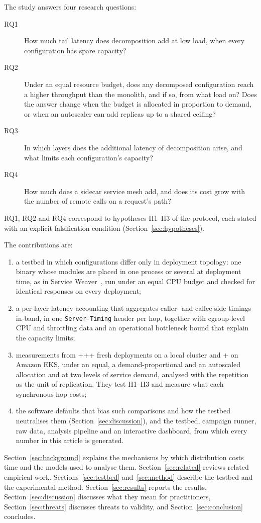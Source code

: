 The study answers four research questions:
\begin{description}
\item[RQ1] How much tail latency does decomposition add at low load, when every configuration has spare
capacity?
\item[RQ2] Under an equal resource budget, does any decomposed configuration reach a higher throughput than the
monolith, and if so, from what load on? Does the answer change when the budget is allocated in
proportion to demand, or when an autoscaler can add replicas up to a shared ceiling?
\item[RQ3] In which layers does the additional latency of decomposition arise, and what limits each
configuration's capacity?
\item[RQ4] How much does a sidecar service mesh add, and does its cost grow with the number of remote calls on a
request's path?
\end{description}
RQ1, RQ2 and RQ4 correspond to hypotheses H1--H3 of the protocol, each stated with an explicit falsification
condition (Section~\ref{sec:hypotheses}).



The contributions are:
\begin{enumerate}
\item a testbed in which configurations differ only in deployment topology: one binary whose modules are placed in
one process or several at deployment time, as in Service Weaver~\cite{Ghemawat2023}, run under an equal CPU budget
and checked for identical responses on every deployment;
\item a per-layer latency accounting that aggregates caller- and callee-side timings in-band, in one
\texttt{Server-Timing} header per hop, together with cgroup-level CPU and throttling data and an operational
bottleneck bound that explain the capacity limits;
\item measurements from \the\numexpr{}+++\relax{} fresh
deployments on a local cluster and \the\numexpr{}+\relax{} on Amazon EKS, under an
equal, a demand-proportional and an autoscaled allocation and at two levels of service demand, analysed with the repetition as the unit of
replication. They test H1--H3 and measure what each synchronous hop costs;
\item the software defaults that bias such comparisons and how the testbed neutralises them (Section~\ref{sec:discussion}),
and the testbed, campaign runner, raw data, analysis pipeline and an interactive dashboard, from which every number
in this article is generated.
\end{enumerate}

Section~\ref{sec:background} explains the mechanisms by which distribution costs time and the models used to
analyse them. Section~\ref{sec:related} reviews related empirical work. Sections~\ref{sec:testbed}
and~\ref{sec:method} describe the testbed and the experimental method. Section~\ref{sec:results} reports the results, Section~\ref{sec:discussion} discusses what they mean for practitioners,
Section~\ref{sec:threats} discusses threats to validity, and Section~\ref{sec:conclusion} concludes.

